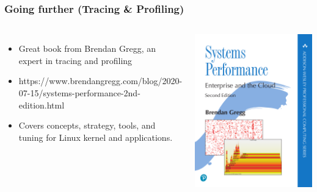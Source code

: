 \begin{frame}[fragile]
  \frametitle{Going further (Tracing \& Profiling)}
  \begin{columns}
    \begin{itemize}
    \item Great book from Brendan Gregg, an expert in tracing and profiling
    \item https://www.brendangregg.com/blog/2020-07-15/systems-performance-2nd-edition.html
    \item Covers concepts, strategy, tools, and tuning for Linux kernel
      and applications.
    \end{itemize}
    \includegraphics[height=0.6\textheight]{slides/debugging-system-wide-profiling/sysperf2nd_bookcover.png}\\ 
  \end{columns}
\end{frame}

